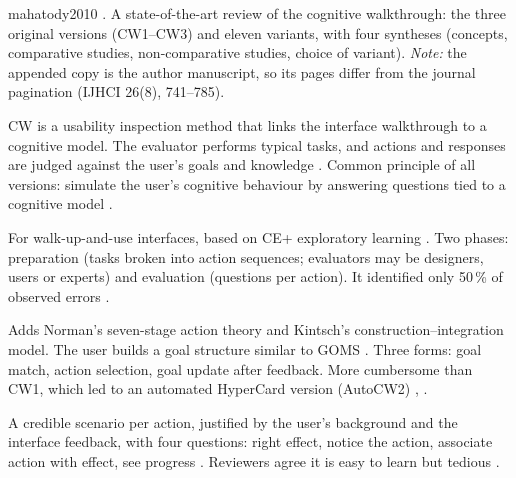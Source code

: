 \begin{papercard}{mahatody2010}
 . A state-of-the-art review of the cognitive walkthrough: the three original versions (CW1--CW3) and eleven variants, with four syntheses (concepts, comparative studies, non-comparative studies, choice of variant). \emph{Note:} the appended copy is the author manuscript, so its pages differ from the journal pagination (IJHCI 26(8), 741--785).

 CW is a usability inspection method that links the interface walkthrough to a cognitive model. The evaluator performs typical tasks, and actions and responses are judged against the user's goals and knowledge . Common principle of all versions: simulate the user's cognitive behaviour by answering questions tied to a cognitive model .

 For walk-up-and-use interfaces, based on CE+ exploratory learning . Two phases: preparation (tasks broken into action sequences; evaluators may be designers, users or experts) and evaluation (questions per action). It identified only 50\,\% of observed errors .

 Adds Norman's seven-stage action theory and Kintsch's construction--integration model. The user builds a goal structure similar to GOMS . Three forms: goal match, action selection, goal update after feedback. More cumbersome than CW1, which led to an automated HyperCard version (AutoCW2) , .

 A credible scenario per action, justified by the user's background and the interface feedback, with four questions: right effect, notice the action, associate action with effect, see progress . Reviewers agree it is easy to learn but tedious .


\end{papercard}
